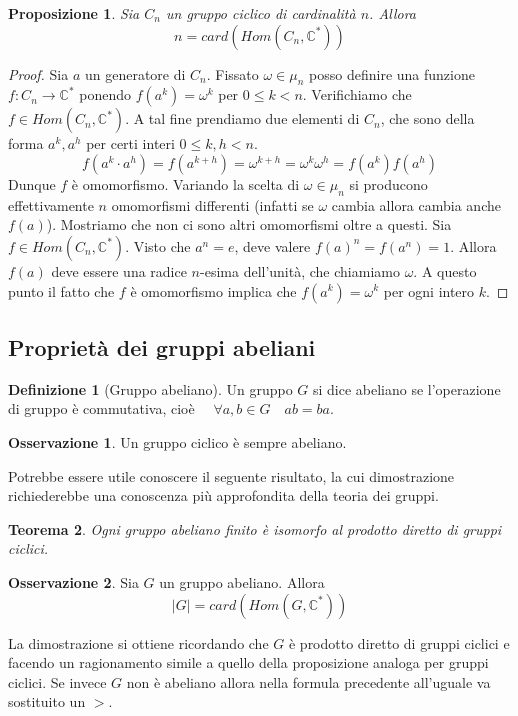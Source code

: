 \documentclass[11pt]{article}
\theoremstyle{plain}
\newtheorem{thm}{Teorema}[section]
\newtheorem{prop}[thm]{Proposizione}
\theoremstyle{definition}
\newtheorem{defn}{Definizione}[section]
\newtheorem*{rem}{Osservazione}
\theoremstyle{remark}
\newcommand{\C}{\mathbb{C}}
\begin{document}
\begin{prop} Sia $C_n$ un gruppo ciclico di cardinalità $n$. Allora
\[ n = card(Hom(C_n,\C^*))\]
\end{prop}
\begin{proof} Sia $a$ un generatore di $C_n$. Fissato $\omega\in\mu_n$ posso definire
una funzione $f:C_n\to\C^*$ ponendo $f(a^k) = \omega^k$ per $0\le k < n$.
Verifichiamo che $f\in Hom(C_n, \C^*)$. A tal fine prendiamo due elementi di $C_n$, che sono della forma $a^k, a^h$ per certi interi $0\le k,h < n$.
\[f(a^k \cdot a^h) = f(a^{k+h}) = \omega^{k+h} = \omega^k \omega^h = f(a^k)f(a^h)\]
Dunque $f$ è omomorfismo. Variando la scelta di $\omega\in\mu_n$ si producono effettivamente $n$ omomorfismi differenti (infatti se $\omega$ cambia allora cambia anche $f(a)$).
Mostriamo che non ci sono altri omomorfismi oltre a questi.
Sia $f\in Hom(C_n,\C^*)$. Visto che $a^n=e$, deve valere $f(a)^n = f(a^n) = 1$. Allora $f(a)$ deve essere una radice $n$-esima
dell'unità, che chiamiamo $\omega$. A questo punto il fatto che $f$ è omomorfismo implica che $f(a^k) = \omega^k$ per ogni intero $k$.
\end{proof}


\subsection{Proprietà dei gruppi abeliani}
\begin{defn}[Gruppo abeliano] Un gruppo $G$ si dice abeliano se l'operazione di gruppo è commutativa, cioè $\quad\forall a,b\in G\quad ab=ba$.
\end{defn}

\begin{rem} Un gruppo ciclico è sempre abeliano.
\end{rem}

Potrebbe essere utile conoscere il seguente risultato, la cui dimostrazione richiederebbe una conoscenza più approfondita della teoria dei gruppi.
\begin{thm}Ogni gruppo abeliano finito è isomorfo al prodotto diretto di gruppi ciclici.
\end{thm}

\begin{rem} Sia $G$ un gruppo abeliano. Allora 
\[ |G| = card(Hom(G,\C^*))\]

La dimostrazione si ottiene ricordando che $G$ è prodotto diretto di gruppi ciclici e facendo un ragionamento simile a quello
della proposizione analoga per gruppi ciclici.
Se invece $G$ non è abeliano allora nella formula precedente all'uguale va sostituito un $>$.
\end{rem}
\end{document}
